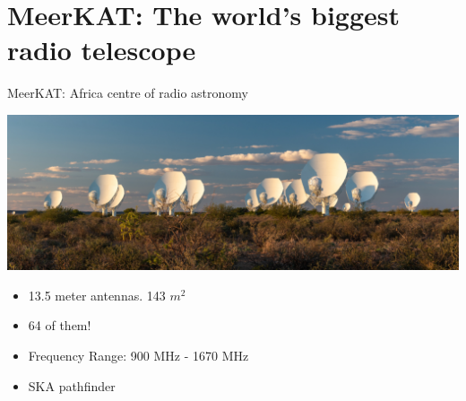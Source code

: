 \documentclass[ignorenonframetext]{beamer}
\begin{document}
% 


% 


\section{MeerKAT: The world's biggest radio telescope}

\frame{\tableofcontents[currentsection]}

\begin{frame}{MeerKAT: Africa centre of radio astronomy}
\begin{center}
  \includegraphics[width=\linewidth]{fig/2018-MeerKAT-5-1030x355.jpg}
\end{center}
\begin{itemize}
 \item 13.5 meter antennas. 143 $m^2$
 \item 64 of them!
 \item Frequency Range: 900 MHz - 1670 MHz
 \item SKA pathfinder
\end{itemize}

\end{frame}
\end{document}

